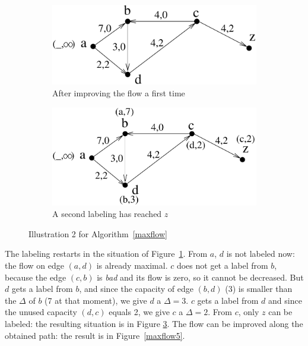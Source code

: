 \begin{figure}[ht]
	\centering
	\begin{subfigure}{0.41\linewidth}
		\centering
		\includegraphics[width=\linewidth,keepaspectratio]{maxflow3}
		\caption{After improving the flow a first time}
		\label{maxflow3}
	\end{subfigure}\qquad\qquad
	\begin{subfigure}{0.41\linewidth}
		\centering
		\includegraphics[width=\linewidth,keepaspectratio]{maxflow4}
		\caption{A second labeling has reached $z$}
		\label{maxflow4}
	\end{subfigure}
	\caption{Illustration 2 for Algorithm~\ref{maxflow}}
\end{figure}

The labeling restarts in the situation of Figure~\ref{maxflow3}. From
$a$, $d$ is not labeled now: the flow on edge $(a,d)$ is already
maximal. $c$ does not get a label from $b$, because the edge $(c,b)$
is {\em bad} and its flow is zero, so it cannot be decreased. But $d$
gets a label from $b$, and since the capacity of edge $(b,d)$ (3)
is smaller than the $\Delta$ of $b$ (7 at that moment), we give $d$ a
$\Delta = 3$. $c$ gets a label from $d$ and since the unused capacity
$(d,c)$ equals 2, we give $c$ a $\Delta = 2$. From $c$, only $z$ can be
labeled: the resulting situation is in Figure \ref{maxflow4}. The flow
can be improved along the obtained path: the result is in
Figure~\ref{maxflow5}.

